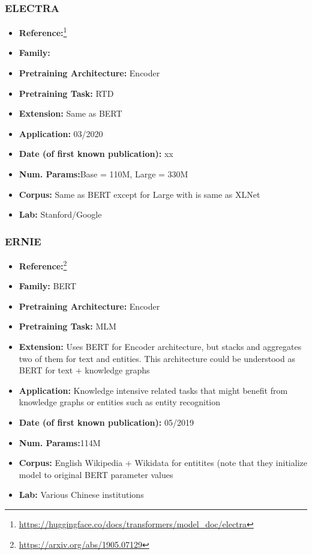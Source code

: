 \documentclass{article}
\begin{document}
\subsubsection{ELECTRA}

            \begin{itemize}
                \item \textbf{Reference:}\footnote{\url{https://huggingface.co/docs/transformers/model_doc/electra}}\cite{clark2020electra}
                \item \textbf{Family:} 
                \item \textbf{Pretraining Architecture:} Encoder
                \item \textbf{Pretraining Task:} RTD
                \item \textbf{Extension:} Same as BERT  
                \item \textbf{Application:} 03/2020
                \item \textbf{Date (of first known publication):} xx
                \item \textbf{Num. Params:}Base = 110M, Large = 330M
                \item \textbf{Corpus:} Same as BERT except for Large with is same as XLNet
                \item \textbf{Lab:} Stanford/Google
            \end{itemize}

\subsubsection{ERNIE}

            \begin{itemize}
                \item \textbf{Reference:}\footnote{\url{https://arxiv.org/abs/1905.07129}}\cite{zhang2019ernie}
                \item \textbf{Family:} BERT 
                \item \textbf{Pretraining Architecture:} Encoder
                \item \textbf{Pretraining Task:} MLM
                \item \textbf{Extension:} Uses BERT for Encoder architecture, but stacks and aggregates two of them for text and entities. This architecture could be understood as BERT for text + knowledge graphs  
                \item \textbf{Application:} Knowledge intensive related tasks that might benefit from knowledge graphs or entities such as entity recognition
                \item \textbf{Date (of first known publication):} 05/2019
                \item \textbf{Num. Params:}114M
                \item \textbf{Corpus:} English Wikipedia + Wikidata for entitites (note that they initialize model to original BERT parameter values
                \item \textbf{Lab:} Various Chinese institutions
            \end{itemize} 
            
\end{document}
